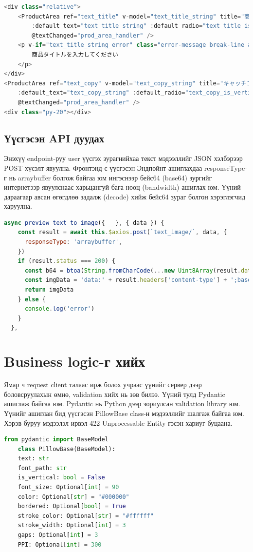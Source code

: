 \begin{lstlisting}[language=JavaScript,caption={ProductArea компонент ашигласан байдал},frame=single]
	<div class="relative">
	<ProductArea ref="text_title" v-model="text_title_string" title="商品タイトル" identifier="1"
		:default_text="text_title_string" :default_radio="text_title_is_vertical"
		@textChanged="prod_area_handler" />
	<p v-if="text_title_string_error" class="error-message break-line absolute top110">
		商品タイトルを入力してください
	</p>
</div>
<ProductArea ref="text_copy" v-model="text_copy_string" title="キャッチコピー" identifier="2"
	:default_text="text_copy_string" :default_radio="text_copy_is_vertical"
	@textChanged="prod_area_handler" />
<div class="py-20"></div>

	\end{lstlisting}

\subsection{Үүсгэсэн API дуудах}
Энэхүү endpoint-руу user үүсгэх зурагнийхаа текст мэдээллийг JSON хэлбэрээр POST хүсэлт явуулна. Фронтэнд-с үүсгэсэн Эндпойнт ашиглахдаа responseType-г нь arraybuffer болгож байгаа юм ингэснээр бейс64 (base64) зургийг интернетээр явуулснаас харьцангуй бага нөөц (bandwidth) ашиглах юм. Үүний дараагаар авсан өгөгдлөө задалж (decode) хийж бейс64 зураг болгон хэрэглэгчид харуулна.


\begin{lstlisting}[language=JavaScript,caption={Endpoint дуудах function},frame=single]
	async preview_text_to_image({ _ }, { data }) {
    const result = await this.$axios.post(`text_image/`, data, {
      responseType: 'arraybuffer',
    })
    if (result.status === 200) {
      const b64 = btoa(String.fromCharCode(...new Uint8Array(result.data)))
      const imgData = 'data:' + result.headers['content-type'] + ';base64,' + b64
      return imgData
    } else {
      console.log('error')
    }
  },
\end{lstlisting}

\section{Business logic-г хийх}
Ямар ч request client талаас ирж болох учраас үүнийг сервер дээр боловсруулахын өмнө, validation хийх нь зөв билээ. Үүний тулд Pydantic ашиглаж байгаа юм. Pydantic нь Python дээр зориулсан validation library юм. Үүнийг ашиглан бид үүсгэсэн PillowBase class-н мэдээллийг шалгаж байгаа юм. Хэрэв буруу мэдээлэл ирвэл 422 Unprocessable Entity гэсэн хариуг буцаана.
\begin{lstlisting}[language=Python,caption={Pydantic Validator},frame=single]
	from pydantic import BaseModel
	class PillowBase(BaseModel):
    text: str
    font_path: str
    is_vertical: bool = False
    font_size: Optional[int] = 90
    color: Optional[str] = "#000000"
    bordered: Optional[bool] = True
    stroke_color: Optional[str] = "#ffffff"
    stroke_width: Optional[int] = 3
    gaps: Optional[int] = 3
    PPI: Optional[int] = 300
\end{lstlisting}

